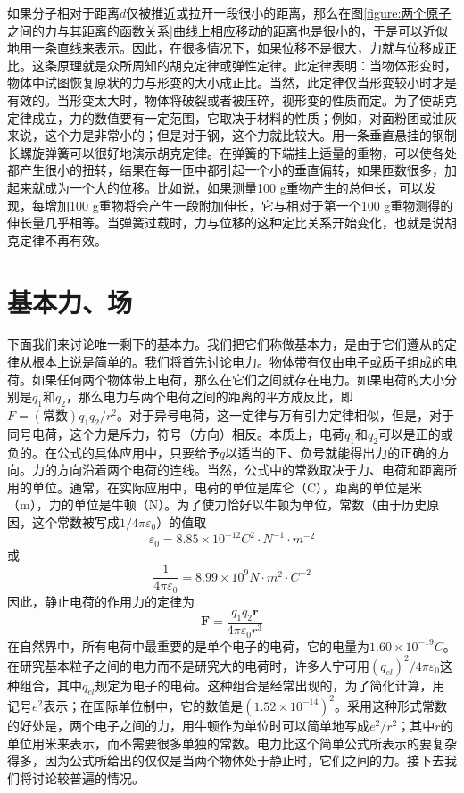 如果分子相对于距离$d$仅被推近或拉开一段很小的距离，那么在图\ref{figure:两个原子之间的力与其距离的函数关系}曲线上相应移动的距离也是很小的，于是可以近似地用一条直线来表示。因此，在很多情况下，如果位移不是很大，力就与位移成正比。这条原理就是众所周知的胡克定律或弹性定律。此定律表明：当物体形变时，物体中试图恢复原状的力与形变的大小成正比。当然，此定律仅当形变较小时才是有效的。当形变太大时，物体将破裂或者被压碎，视形变的性质而定。为了使胡克定律成立，力的数值要有一定范围，它取决于材料的性质；例如，对面粉团或油灰来说，这个力是非常小的；但是对于钢，这个力就比较大。用一条垂直悬挂的钢制长螺旋弹簧可以很好地演示胡克定律。在弹簧的下端挂上适量的重物，可以使各处都产生很小的扭转，结果在每一匝中都引起一个小的垂直偏转，如果匝数很多，加起来就成为一个大的位移。比如说，如果测量100 g重物产生的总伸长，可以发现，每增加100 g重物将会产生一段附加伸长，它与相对于第一个100 g重物测得的伸长量几乎相等。当弹簧过载时，力与位移的这种定比关系开始变化，也就是说胡克定律不再有效。

\section{基本力、场}

下面我们来讨论唯一剩下的基本力。我们把它们称做基本力，是由于它们遵从的定律从根本上说是简单的。我们将首先讨论电力。物体带有仅由电子或质子组成的电荷。如果任何两个物体带上电荷，那么在它们之间就存在电力。如果电荷的大小分别是$q_1$和$q_2$，那么电力与两个电荷之间的距离的平方成反比，即$F=(\text{常数})q_1q_2/r^2$。对于异号电荷，这一定律与万有引力定律相似，但是，对于同号电荷，这个力是斥力，符号（方向）相反。本质上，电荷$q_1$和$q_2$可以是正的或负的。在公式的具体应用中，只要给予$q$以适当的正、负号就能得出力的正确的方向。力的方向沿着两个电荷的连线。当然，公式中的常数取决于力、电荷和距离所用的单位。通常，在实际应用中，电荷的单位是库仑（C），距离的单位是米（m），力的单位是牛顿（N）。为了使力恰好以牛顿为单位，常数（由于历史原因，这个常数被写成$1/4 \pi \varepsilon_0$）的值取
\begin{equation*}
    \varepsilon_0=8.85 \times 10^{-12} C^2 \cdot N^{-1} \cdot m^{-2}
\end{equation*}
或
\begin{equation*}
    \frac{1}{4 \pi \varepsilon_0}=8.99 \times 10^9 N \cdot m^2 \cdot C^{-2}
\end{equation*}
因此，静止电荷的作用力的定律为
\begin{equation}
    \label{Eq:I:12:2}
    \boldsymbol{F}=\frac{q_1q_2 \boldsymbol{r}}{4 \pi \varepsilon_0 r^3}
\end{equation}
在自然界中，所有电荷中最重要的是单个电子的电荷，它的电量为$1.60 \times 10^{-19}C$。在研究基本粒子之间的电力而不是研究大的电荷时，许多人宁可用$(q_{el})^2/4 \pi \varepsilon_0$这种组合，其中$q_{el}$规定为电子的电荷。这种组合是经常出现的，为了简化计算，用记号$e^2$表示；在国际单位制中，它的数值是$(1.52 \times 10^{-14})^2$。采用这种形式常数的好处是，两个电子之间的力，用牛顿作为单位时可以简单地写成$e^2/r^2$；其中$r$的单位用米来表示，而不需要很多单独的常数。电力比这个简单公式所表示的要复杂得多，因为公式所给出的仅仅是当两个物体处于静止时，它们之间的力。接下去我们将讨论较普遍的情况。

